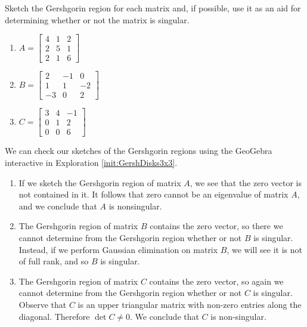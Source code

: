 \documentclass{ximera}
\begin{document}
\begin{example}\label{ex:does_Gersh_contain_zero}
    Sketch the Gershgorin region for each matrix and, if possible, use it as an aid for determining whether or not the matrix is singular.
\begin{enumerate}
    \item $A=\begin{bmatrix}  4&1&2\\2&5&1\\2&1&6
 \end{bmatrix}$
    \item $B=\begin{bmatrix}  2&-1&0\\1&1&-2\\-3&0&2
 \end{bmatrix}$
 \item $C=\begin{bmatrix}3 & 4 & -1\\0&1&2\\0&0&6\end{bmatrix}$
 \end{enumerate}

\begin{explanation}
    We can check our sketches of the Gershgorin regions using the GeoGebra interactive in Exploration \ref{init:GershDisks3x3}.
    
\begin{enumerate}
    \item If we sketch the Gershgorin region of matrix $A$, we see that the zero vector is not contained in it.  It follows that zero cannot be an eigenvalue of matrix $A$, and we conclude that $A$ is nonsingular.

    \item The Gershgorin region of matrix $B$ contains the zero vector, so there we cannot determine from the Gershgorin region whether or not $B$ is singular.  Instead, if we perform Gaussian elimination on matrix $B$, we will see it is not of full rank, and so $B$ is singular.

    \item The Gershgorin region of matrix $C$ contains the zero vector, so again we cannot determine from the Gershgorin region whether or not $C$ is singular. Observe that $C$ is an upper triangular matrix with non-zero entries along the diagonal.  Therefore $\det{C}\neq 0$.  We conclude that $C$ is non-singular.
\end{enumerate}
\end{explanation}
\end{example}
\end{document}
